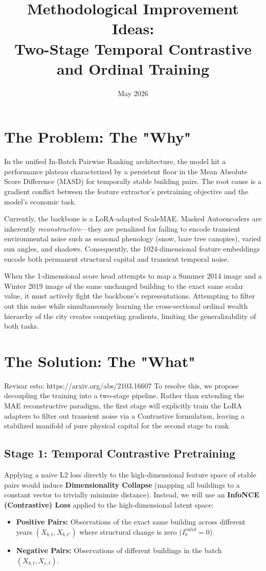 \documentclass[12pt]{article}
\title{Methodological Improvement Ideas: \\ Two-Stage Temporal Contrastive and Ordinal Training}
\author{}
\date{May 2026}
\begin{document}
\maketitle

\section{The Problem: The "Why"}

In the unified In-Batch Pairwise Ranking architecture, the model hit a performance plateau characterized by a persistent floor in the Mean Absolute Score Difference (MASD) for temporally stable building pairs. The root cause is a gradient conflict between the feature extractor's pretraining objective and the model's economic task.

Currently, the backbone is a LoRA-adapted ScaleMAE. Masked Autoencoders are inherently \textit{reconstructive}---they are penalized for failing to encode transient environmental noise such as seasonal phenology (snow, bare tree canopies), varied sun angles, and shadows. Consequently, the 1024-dimensional feature embeddings encode both permanent structural capital and transient temporal noise. 

When the 1-dimensional score head attempts to map a Summer 2014 image and a Winter 2019 image of the same unchanged building to the exact same scalar value, it must actively fight the backbone's representations. Attempting to filter out this noise while simultaneously learning the cross-sectional ordinal wealth hierarchy of the city creates competing gradients, limiting the generalizability of both tasks.

\section{The Solution: The "What"}
 Revisar esto: https://arxiv.org/abs/2103.16607
To resolve this, we propose decoupling the training into a two-stage pipeline. Rather than extending the MAE reconstructive paradigm, the first stage will explicitly train the LoRA adapters to filter out transient noise via a Contrastive formulation, leaving a stabilized manifold of pure physical capital for the second stage to rank.

\subsection{Stage 1: Temporal Contrastive Pretraining}
Applying a naive L2 loss directly to the high-dimensional feature space of stable pairs would induce \textbf{Dimensionality Collapse} (mapping all buildings to a constant vector to trivially minimize distance). Instead, we will use an \textbf{InfoNCE (Contrastive) Loss} applied to the high-dimensional latent space:
\begin{itemize}
    \item \textbf{Positive Pairs:} Observations of the exact same building across different years $(X_{b, t}, X_{b, t'})$ where structural change is zero ($I_b^{valid} = 0$).
    \item \textbf{Negative Pairs:} Observations of different buildings in the batch $(X_{b, t}, X_{c, t})$.
\end{itemize}
\end{document}
